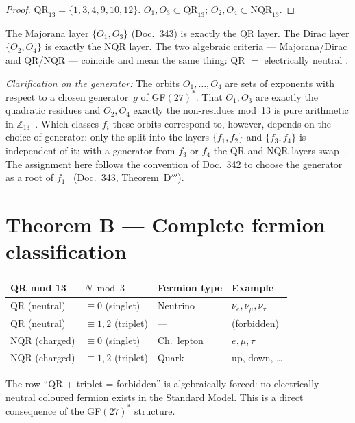 \begin{proof}
$\mathrm{QR}_{13}=\{1,3,4,9,10,12\}$.
$O_1,O_3\subset\mathrm{QR}_{13}$; $O_2,O_4\subset\mathrm{NQR}_{13}$.
\end{proof}

The Majorana layer $\{O_1,O_3\}$ (Doc.~343) is exactly the QR layer.
The Dirac layer $\{O_2,O_4\}$ is exactly the NQR layer. The two algebraic
criteria --- Majorana/Dirac and QR/NQR --- coincide and mean the same thing:
QR $=$ electrically neutral \BM.

\noindent\textit{Clarification on the generator:} The orbits $O_1,\dots,O_4$ are
sets of exponents with respect to a chosen generator~$g$ of GF$(27)^*$. That
$O_1,O_3$ are exactly the quadratic residues and $O_2,O_4$ exactly the
non-residues mod~13 is pure arithmetic in $\mathbb{Z}_{13}$ \BM\,\LM. Which
classes $f_i$ these orbits correspond to, however, depends on the choice of
generator: only the split into the layers $\{f_1,f_2\}$ and $\{f_3,f_4\}$ is
independent of it; with a generator from $f_3$ or $f_4$ the QR and NQR layers
swap \BM\,\LM. The assignment here follows the convention of Doc.~342 to choose
the generator as a root of $f_1$ \SetzM\ (Doc.~343, Theorem~D$'''$).

\section{Theorem B --- Complete fermion classification}

\begin{theorem}
\begin{center}
\begin{tabular}{llll}
\toprule
QR mod 13 & $N\bmod3$ & Fermion type & Example \\
\midrule
QR (neutral) & $\equiv0$ (singlet) & Neutrino & $\nu_e,\nu_\mu,\nu_\tau$ \\
QR (neutral) & $\equiv1,2$ (triplet) & --- & (forbidden) \\
NQR (charged) & $\equiv0$ (singlet) & Ch.\ lepton & $e,\mu,\tau$ \\
NQR (charged) & $\equiv1,2$ (triplet) & Quark & up, down, \ldots \\
\bottomrule
\end{tabular}
\end{center}
\end{theorem}

The row ``QR + triplet = forbidden'' is algebraically forced: no electrically
neutral coloured fermion exists in the Standard Model. This is a direct
consequence of the GF$(27)^*$ structure.

